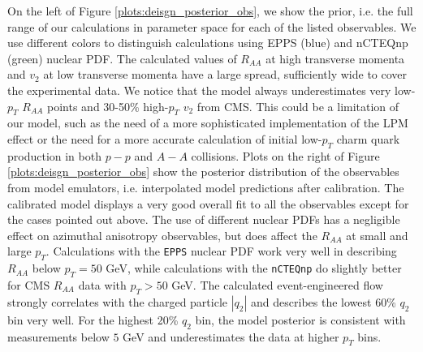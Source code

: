 \documentclass[aps, prc, reprint, amsmath, groupedaddress, nofootinbib]{revtex4-1}
\begin{document}
On the left of Figure \ref{plots:deisgn_posterior_obs}, we show the prior, i.e. the full range of our calculations in parameter space for each of the listed observables. 
We use different colors to distinguish calculations using EPPS (blue) and
nCTEQnp (green) nuclear PDF.
The calculated values of $R_{AA}$ at high transverse momenta and $v_2$ at low transverse momenta have a large spread, sufficiently wide to cover the experimental data.
We notice that the model always underestimates very low-$p_T$ $R_{AA}$ points and 30-50\% high-$p_T$ $v_2$ from CMS.
This could be a limitation of our model, such as the need of a more sophisticated implementation of the LPM effect or the need for a more accurate calculation of initial low-$p_T$ charm quark production in both $p-p$ and $A-A$ collisions. 
Plots on the right of Figure \ref{plots:deisgn_posterior_obs} show the posterior distribution of the observables from model emulators, i.e. interpolated model predictions after calibration.
The calibrated model displays a very good overall fit to all the observables except for the cases pointed out above.
The use of different nuclear PDFs has a  negligible effect on azimuthal anisotropy observables, but does affect the $R_{AA}$ at small and large $p_T$.
Calculations with the {\tt EPPS} nuclear PDF work very well in describing $R_{AA}$ below $p_T = 50$ GeV, while calculations with the {\tt nCTEQnp} do slightly better for CMS $R_{AA}$ data with $p_T>50$ GeV.
The calculated event-engineered flow strongly correlates with the charged particle $|q_2|$ and describes the lowest 60\% $q_2$ bin very well.
For the highest 20\% $q_2$ bin, the model posterior is consistent with measurements below $5$ GeV and underestimates the data at higher $p_T$ bins.
\end{document}
